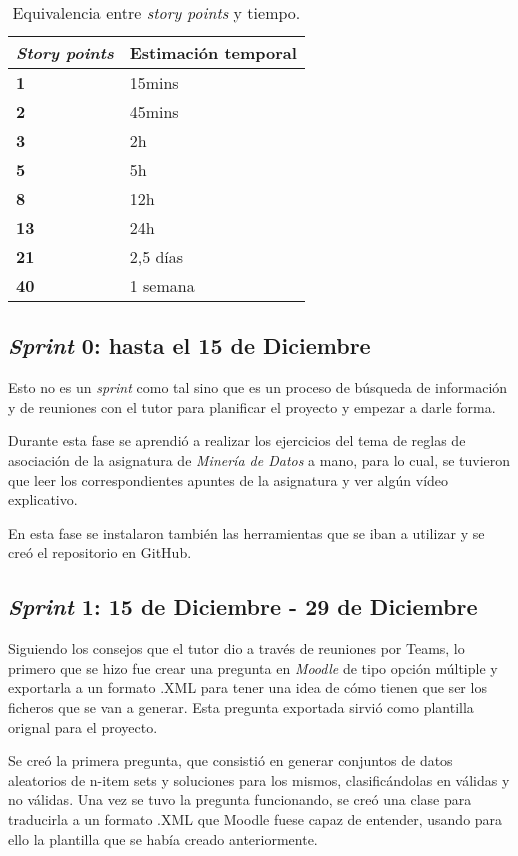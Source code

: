 \begin{table}[h]
	\centering
	\begin{tabularx}{\linewidth}{X p{}}
		\toprule
		\textbf{\textit{Story points}} & \textbf{Estimación temporal} \\
		\toprule
		\textbf{1} & 15mins \\
		\textbf{2} & 45mins \\
		\textbf{3} & 2h \\
		\textbf{5} & 5h \\
		\textbf{8} & 12h \\
		\textbf{13} & 24h \\
		\textbf{21} & 2,5 días \\
		\textbf{40} & 1 semana \\
		\bottomrule
	\end{tabularx}
	\caption{Equivalencia entre \textit{story points} y tiempo.}
\end{table}


\subsection{\textit{Sprint} 0: hasta el 15 de Diciembre}
Esto no es un \textit{sprint} como tal sino que es un proceso de búsqueda de información y de reuniones con el tutor para planificar el proyecto y empezar a darle forma. 

Durante esta fase se aprendió a realizar los ejercicios del tema de reglas de asociación de la asignatura de \textit{Minería de Datos} a mano, para lo cual, se tuvieron que leer los correspondientes apuntes de la asignatura y ver algún vídeo explicativo. 

En esta fase se instalaron también las herramientas que se iban a utilizar y se creó el repositorio en GitHub.

\subsection{\textit{Sprint} 1: 15 de Diciembre - 29 de Diciembre}
Siguiendo los consejos que el tutor dio a través de reuniones por Teams, lo primero que se hizo fue crear una pregunta en \textit{Moodle} de tipo opción múltiple y exportarla a un formato .XML para tener una idea de cómo tienen que ser los ficheros que se van a generar. Esta pregunta exportada sirvió como plantilla orignal para el proyecto.

Se creó la primera pregunta, que consistió en generar conjuntos de datos aleatorios de n-item sets y soluciones para los mismos, clasificándolas en válidas y no válidas. Una vez se tuvo la pregunta funcionando, se creó una clase para traducirla a un formato .XML que Moodle fuese capaz de entender, usando para ello la plantilla que se había creado anteriormente.

